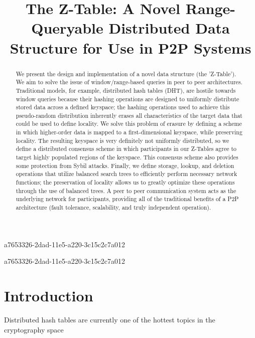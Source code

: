 \documentclass[12pt]{article}
\title{The Z-Table: A Novel Range-Queryable Distributed Data Structure for Use in P2P Systems}
\begin{document}
a7653326-2dad-11e5-a220-3c15c2c7a012
\maketitle
a7653326-2dad-11e5-a220-3c15c2c7a012
\begin{abstract}
We present the design and implementation of a novel data structure (the 'Z-Table'). We aim to solve the issue of window/range-based queries in peer to peer architectures. Traditional models, for example,  distributed hash tables (DHT), are hostile towards window queries because their hashing operations are designed to uniformly distribute stored data across a defined keyspace; the hashing operations used to achieve this pseudo-random distribution inherently erases all characteristics of the target data that could be used to define locality. We solve this problem of erasure by defining a scheme in which higher-order data is mapped to a first-dimensional keyspace, while preserving locality. The resulting keyspace is very definitely not uniformly distributed, so we define a distributed consensus scheme in which participants in our Z-Tables agree to target highly populated regions of the keyspace. This consensus scheme also provides some protection from Sybil attacks. Finally, we define storage, lookup, and deletion operations that utilize balanced search trees to efficiently perform necessary network functions; the preservation of locality allows us to greatly optimize these operations through the use of balanced trees. A peer to peer communication system acts as the underlying network for participants, providing all of the traditional benefits of a P2P architecture (fault tolerance, scalability, and truly independent operation).
\end{abstract}


\newpage
\section{Introduction}
Distributed hash tables are currently one of the hottest topics in the cryptography space~\cite{Stoica:2001dj,Rowstron:2001ea,Ratnasamy:2001wn}

\printbibliography
\end{document}
